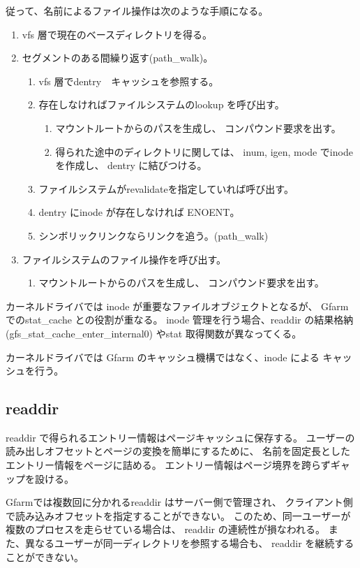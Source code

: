 	従って、名前によるファイル操作は次のような手順になる。

	\begin{enumerate}
	\item	vfs 層で現在のベースディレクトリを得る。
	\item	セグメントのある間繰り返す(path_walk)。
		\begin{enumerate}
		\item	vfs 層でdentry　キャッシュを参照する。
		\item	存在しなければファイルシステムのlookup を呼び出す。
			\begin{enumerate}
			\item	マウントルートからのパスを生成し、
				コンパウンド要求を出す。
			\item	得られた途中のディレクトリに関しては、
				inum, igen, mode でinode を作成し、
				dentry に結びつける。
			\end{enumerate}
		\item	ファイルシステムがrevalidateを指定していれば呼び出す。
		\item	dentry にinode が存在しなければ ENOENT。
		\item	シンボリックリンクならリンクを追う。(path_walk)
		\end{enumerate}
	\item	ファイルシステムのファイル操作を呼び出す。
		\begin{enumerate}
		\item	マウントルートからのパスを生成し、
			コンパウンド要求を出す。
		\end{enumerate}
	\end{enumerate}


	カーネルドライバでは inode が重要なファイルオブジェクトとなるが、
	Gfarm でのstat_cache との役割が重なる。
	inode 管理を行う場合、readdir の結果格納(gfs_stat_cache_enter_internal0)
	やstat 取得関数が異なってくる。

	カーネルドライバでは Gfarm のキャッシュ機構ではなく、inode による
	キャッシュを行う。

\subsection{readdir}
	readdir で得られるエントリー情報はページキャッシュに保存する。
	ユーザーの読み出しオフセットとページの変換を簡単にするために、
	名前を固定長としたエントリー情報をページに詰める。
	エントリー情報はページ境界を跨らずギャップを設ける。

	Gfarmでは複数回に分かれるreaddir はサーバー側で管理され、
	クライアント側で読み込みオフセットを指定することができない。
	このため、同一ユーザーが複数のプロセスを走らせている場合は、
	readdir の連続性が損なわれる。
	また、異なるユーザーが同一ディレクトリを参照する場合も、
	readdir を継続することができない。

